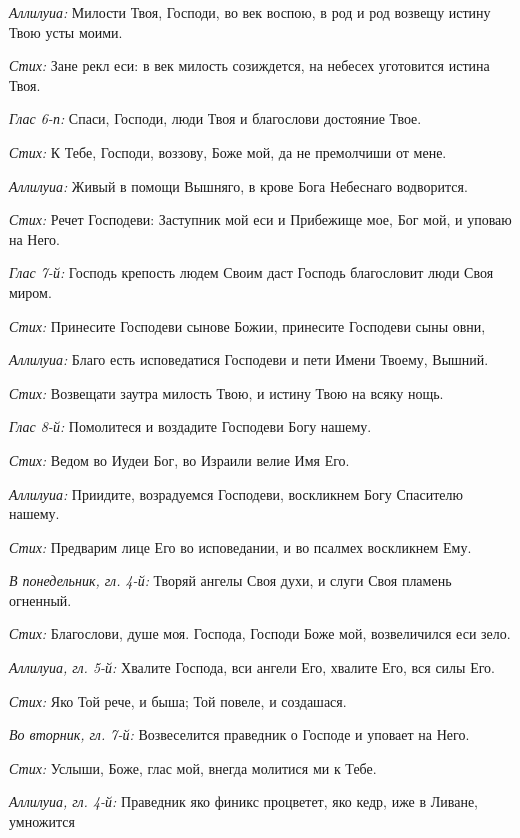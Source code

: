 \begin{mymulticols}
{\itshape Аллилуиа:} Милости Твоя, Господи, во век воспою, в род и род возвещу истину Твою усты моими.

{\itshape Стих:} Зане рекл еси: в век милость созиждется, на небесех уготовится истина Твоя.

{\itshape Глас 6-п:} Спаси, Господи, люди Твоя и благослови достояние Твое.

{\itshape Стих:} К Тебе, Господи, воззову, Боже мой, да не премолчиши от мене.

{\itshape Аллилуиа:} Живый в помощи Вышняго, в крове Бога Небеснаго водворится.

{\itshape Стих:} Речет Господеви: Заступник мой еси и Прибежище мое, Бог мой, и уповаю на Него.

{\itshape Глас 7-й:} Господь крепость людем Своим даст Господь благословит люди Своя миром.

{\itshape Стих:} Принесите Господеви сынове Божии, принесите Господеви сыны овни,

{\itshape Аллилуиа:} Благо есть исповедатися Господеви и пети Имени Твоему, Вышний.

{\itshape Стих:} Возвещати заутра милость Твою, и истину Твою на всяку нощь.

{\itshape Глас 8-й:} Помолитеся и воздадите Господеви Богу нашему.

{\itshape Стих:} Ведом во Иудеи Бог, во Израили велие Имя Его.

{\itshape Аллилуиа:} Приидите, возрадуемся Господеви, воскликнем Богу Спасителю нашему.

{\itshape Стих:} Предварим лице Его во исповедании, и во псалмех воскликнем Ему.


{\itshape В понедельник, гл. 4-й:} Творяй ангелы Своя духи, и слуги Своя пламень огненный.

{\itshape Стих:} Благослови, душе моя. Господа, Господи Боже мой, возвеличился еси зело.

{\itshape Аллилуиа, гл. 5-й:} Хвалите Господа, вси ангели Его, хвалите Его, вся силы Его.

{\itshape Стих:} Яко Той рече, и быша; Той повеле, и создашася.

{\itshape Во вторник, гл. 7-й:} Возвеселится праведник о Господе и уповает на Него.

{\itshape Стих:} Услыши, Боже, глас мой, внегда молитися ми к Тебе.

{\itshape Аллилуиа, гл. 4-й:} Праведник яко финикс процветет, яко кедр, иже в Ливане, умножится


\end{mymulticols}
